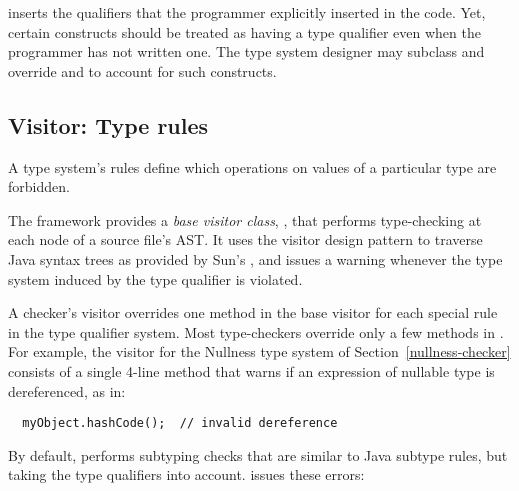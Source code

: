  inserts the qualifiers that the programmer
explicitly inserted in the code.  Yet, certain constructs should be
treated as having a type qualifier even when the programmer has not
written one.  The type system designer may subclass
 and override
 and
 to account for
such constructs.


\subsection{Visitor: Type rules\label{extending-visitor}}

A type system's rules define which operations on values of a
particular type are forbidden.

The framework provides a \textit{base visitor class},
, that performs type-checking at each node of a
source file's AST\@.  It uses the visitor design pattern to traverse
Java syntax trees as provided by Sun's
,
and issues a warning whenever the type system induced by the type
qualifier is violated.

A checker's visitor overrides one method in the base visitor for each special
rule in the type qualifier system.  Most type-checkers
override only a few methods in .  For example, the
visitor for the Nullness type system of Section~\ref{nullness-checker} consists
of a single 4-line method that warns if an expression of nullable type
is dereferenced, as in:
\begin{Verbatim}
  myObject.hashCode();  // invalid dereference
\end{Verbatim}



By default,  performs subtyping checks that are
similar to Java subtype rules, but taking the type qualifiers into account.
 issues these errors:

